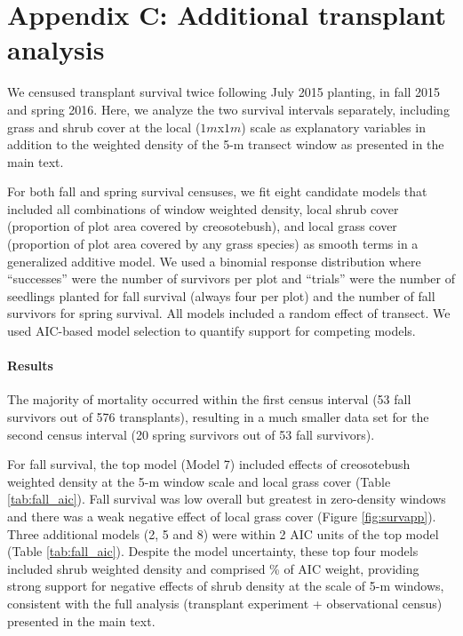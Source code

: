 \documentclass[11pt]{article}\usepackage[]{graphicx}\usepackage[usenames,dvipsnames]{xcolor}
\begin{document}
\newpage
\section*{Appendix C: Additional transplant analysis}
\renewcommand{\thefigure}{C\arabic{figure}}\setcounter{figure}{0}
\renewcommand{\thetable}{C\arabic{table}}\setcounter{table}{0}
\renewcommand{\theequation}{C\arabic{equation}}\setcounter{equation}{0}

We censused transplant survival twice following July 2015 planting, in fall 2015 and spring 2016. 
Here, we analyze the two survival intervals separately, including grass and shrub cover at the local ($1m$x$1m$) scale as explanatory variables in addition to the weighted density of the 5-m transect window as presented in the main text. 

For both fall and spring survival censuses, we fit eight candidate models that included all combinations of window weighted density, local shrub cover (proportion of plot area covered by creosotebush), and local grass cover (proportion of plot area covered by any grass species) as smooth terms in a generalized additive model.
We used a binomial response distribution where ``successes'' were the number of survivors per plot and ``trials'' were the number of seedlings planted for fall survival (always four per plot) and the number of fall survivors for spring survival. 
All models included a random effect of transect. 
We used AIC-based model selection to quantify support for competing models. 

\paragraph{Results}The majority of mortality occurred within the first census interval (53 fall survivors out of 576 transplants), resulting in a much smaller data set for the second census interval (20 spring survivors out of 53 fall survivors).

For fall survival, the top model (Model 7) included effects of creosotebush weighted density at the 5-m window scale and local grass cover (Table \ref{tab:fall_aic}). 
Fall survival was low overall but greatest in zero-density windows and there was a weak negative effect of local grass cover (Figure \ref{fig:survapp}).
Three additional models (2, 5 and 8) were within 2 AIC units of the top model (Table \ref{tab:fall_aic}). 
Despite the model uncertainty, these top four models included shrub weighted density and comprised \% of AIC weight, providing strong support for negative effects of shrub density at the scale of 5-m windows, consistent with the full analysis (transplant experiment + observational census) presented in the main text.
\end{document}

